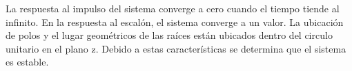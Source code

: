 La respuesta al impulso del sistema converge a cero cuando el tiempo tiende al infinito.
En la respuesta al escalón, el sistema converge a un valor.
La ubicación de polos y el lugar geométricos de las raíces están ubicados dentro 
del circulo unitario en el plano z. Debido a estas características se determina que el sistema 
es estable.